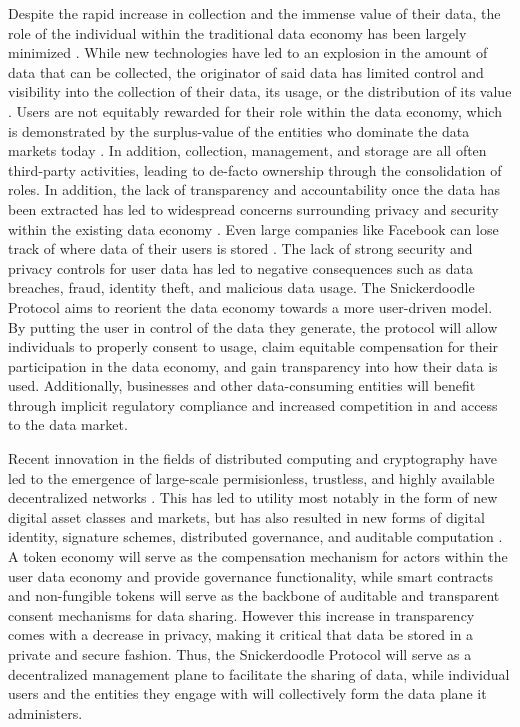 Despite the rapid increase in collection and the immense value of their data, the role of the individual within the traditional data economy has been largely minimized \cite{DataOwnershipBigTechAccessControl}\cite{DataEconomyCitzenConsumer}. While new technologies have led to an explosion in the amount of data that can be collected, the originator of said data has limited control and visibility into the collection of their data, its usage, or the distribution of its value \cite{auxier_americans_2019}. Users are not equitably rewarded for their role within the data economy, which is demonstrated by the surplus-value of the entities who dominate the data markets today \cite{DataOwnershipBigTechAccessControl}\cite{DataEconomyValueOfData}\cite{DataAssetValuation}. In addition, collection, management, and storage are all often third-party activities, leading to de-facto ownership through the consolidation of roles. In addition, the lack of transparency and accountability once the data has been extracted has led to widespread concerns surrounding privacy and security within the existing data economy \cite{auxier_americans_2019}\cite{ConsolitdationWeb}. Even large companies like Facebook can lose track of where data of their users is stored \cite{FacebookDoesntKnow}. The lack of strong security and privacy controls for user data has led to negative consequences such as data breaches, fraud, identity theft, and malicious data usage.
The Snickerdoodle Protocol aims to reorient the data economy towards a more user-driven model. By putting the user in control of the data they generate, the protocol will allow individuals to properly consent to usage, claim equitable compensation for their participation in the data economy, and gain transparency into how their data is used. Additionally, businesses and other data-consuming entities will benefit through implicit regulatory compliance and increased competition in and access to the data market.

Recent innovation in the fields of distributed computing and cryptography have led to the emergence of large-scale permisionless, trustless, and highly available decentralized networks \cite{SANTANA2022121806}. This has led to utility most notably in the form of new digital asset classes and markets, but has also resulted in new forms of digital identity, signature schemes, distributed governance, and auditable computation \cite{Politou2022}. A token economy will serve as the compensation mechanism for actors within the user data economy and provide governance functionality, while smart contracts and non-fungible tokens will serve as the backbone of auditable and transparent consent mechanisms for data sharing. However this increase in transparency comes with a decrease in privacy, making it critical that data be stored in a private and secure fashion. Thus, the Snickerdoodle Protocol will serve as a decentralized management plane to facilitate the sharing of data, while individual users and the entities they engage with will collectively form the data plane it administers. 

